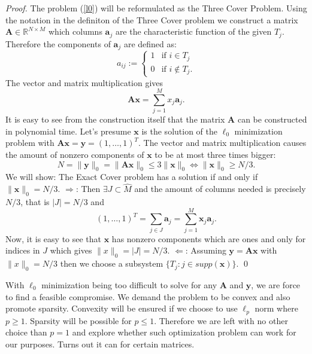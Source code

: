 \documentclass[11pt,american]{book} %
\theoremstyle{plain}
\theoremstyle{definition}
\newtheorem{rmrk}{Remark}
\begin{document}
\emph{Proof.} The problem (\ref{l0}) will be reformulated as the Three Cover Problem. Using the notation in the definiton of the Three Cover problem we construct a matrix $\bm{A} \in \mathbb{R}^{N \times M}$ which columns $\bm{a}_j$ are the characteristic function of the given $T_j$. Therefore the components of $\bm{a}_j$ are defined as:
\begin{equation*}
	a_{ij} := \begin{cases}
		1 &\text{if $i \in T_j$}\\
		0 &\text{if $i \notin T_j$}.
	\end{cases}
\end{equation*}
The vector and matrix multiplication gives
\begin{equation*}
	\bm{A} \bm{x}=\sum_{j=1}^{M}x_j \bm{a}_{j}.
\end{equation*}
It is easy to see from the construction itself that the matrix $\bm{A}$ can be constructed in polynomial time. Let's presume $\bm{x}$ is the solution of the $\ell_{0}$ minimization problem with $\bm{A} \bm{x}= \bm{y} = (1,\dots,1)^{T}$. The vector and matrix multiplication causes the amount of nonzero components of $\bm{x}$ to be at most three times bigger:
\begin{equation*}
	N = \lVert \bm{y} \rVert_{0} = \lVert \bm{A} \bm{x}\rVert_{0}\leqslant 3 \lVert \bm{x} \rVert_{0} \Leftrightarrow \lVert \bm{x} \rVert_{0} \geqslant N/3.
\end{equation*}
We will show: The Exact Cover problem has a solution if and only if $\lVert \bm{x} \rVert_{0} = N/3$.\newline
$\Rightarrow$: Then $\exists J \subset \hat{M}$ and the amount of columns needed is precisely $N/3$, that is $|J| = N/3$ and
\begin{equation*}
	(1,\dots,1)^{T} = \sum_{j \in J} \bm{a}_j = \sum_{j =1}^{M} \bm{x}_j \bm{a}_j.
\end{equation*}
Now, it is easy to see that $\bm{x}$ has nonzero components which are ones and only for indices in $J$ which gives $\lVert x\rVert_{0}=|J|= N/3$.
\newline
$\Leftarrow$:
Assuming $\bm{y}=\bm{A}\bm{x}$ with $\lVert x\rVert_{0}=N/3$ then we choose a subsystem $\{T_j: j \in supp(\bm{x})\}$.
\qed

\medskip
	With $\ell_{0}$ minimization being too difficult to solve for any $\bm{A}$ and $\bm{y}$, we are force to find a feasible compromise. We demand the problem to be convex and also promote sparsity. Convexity will be ensured if we choose to use $\ell_{p}$ norm where $p\geqslant1$. Sparsity will be possible for $p\leqslant 1$. Therefore we are left with no other choice than $p = 1$ and explore whether such optimization problem can work for our purposes. Turns out it can for certain matrices.
\end{document}
